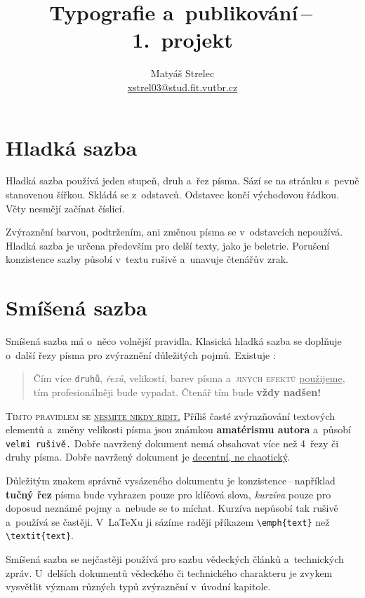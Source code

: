\documentclass[hidelinks, 10pt, twocolumn]{article}
\begin{document}
\title{Typografie a~publikování\,{}--\,{}1.\ projekt}
\author{Matyáš Strelec \\ \href{mailto:xstrel03@stud.fit.vutbr.cz}{xstrel03@stud.fit.vutbr.cz}}
\date{}

\maketitle

\section{Hladká sazba}

Hladká sazba používá jeden stupeň, druh a~řez písma.
Sází se na stránku s~pevně stanovenou šířkou.
Skládá se z~odstavců. Odstavec končí východovou řádkou.
Věty nesmějí začínat číslicí.
\par
Zvýraznění barvou, podtržením, ani změnou písma se v~odstavcích nepoužívá.
Hladká sazba je určena především pro delší texty, jako je beletrie.
Porušení konzistence sazby působí v~textu rušivě a~unavuje čtenářův zrak.

\section{Smíšená sazba}

Smíšená sazba má o~něco volnější pravidla.
Klasická hladká sazba se doplňuje o~další řezy písma pro zvýraznění důležitých pojmů.
Existuje :

\begin{quotation}
    Čím více \texttt{druhů}, \textit{řezů}, {\tiny{velikostí}}, {\color{green}
    barev} písma a~\textsc{\color{blue}jiných efektů} \underline{použijeme},
    {\color{red}tím profesionálněji} bude {\selectfont{dokument}} vypadat.
    Čtenář tím bude \textbf{\Huge{vždy nadšen!}}
\end{quotation}

\textsc{Tímto pravidlem se \underline{nesmíte nikdy řídit.}}
Příliš časté zvýrazňování textových elementů a~změny {\scriptsize{velikosti}} písma jsou
známkou \textbf{amatérismu autora} a~působí \texttt{velmi rušivě.}
Dobře navržený dokument nemá obsahovat více než 4~řezy či druhy písma.
Dobře navržený dokument je \underline{decentní, ne chaotický}.
\par
Důležitým znakem správně vysázeného dokumentu je konzistence\,{}--\,{}například \textbf{tučný řez}
písma bude vyhrazen pouze pro klíčová slova, \textit{kurzíva} pouze pro doposud neznámé pojmy a~nebude se to míchat.
Kurzíva nepůsobí tak rušivě a~používá se častěji.
V~\LaTeX{}u ji sázíme raději příkazem \verb|\emph{text}| než \verb|\textit{text}|.
\par
Smíšená sazba se nejčastěji používá pro sazbu vědeckých článků a~technických zpráv.
U~delších dokumentů vědeckého či technického charakteru je zvykem vysvětlit význam různých typů zvýraznění v~úvodní kapitole.
\end{document}
